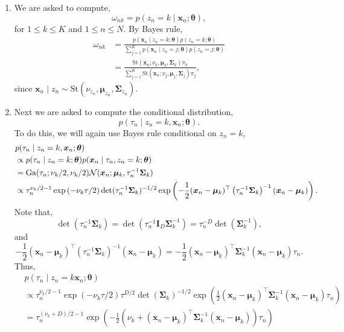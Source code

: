 \begin{enumerate}[label = (\alph*)]
    \item We are asked to compute,
    \[\omega_{nk} = p(z_n = k \mid \bm{x}_n;\bm{\theta}), \]
    for $1 \le k \le K$ and $1 \le n \le N$. By Bayes rule,
    \begin{align*}
        \omega_{nk} &= \frac{p(\bm{x}_n \mid z_n = k; \bm{\theta})p(z_n = k ;\bm{\theta})}{\sum_{j=1}^K p(\bm{x}_n \mid z_n = j; \bm{\theta})p(z_n = j ;\bm{\theta})}\\
        &= \frac{\mathrm{St}(\bm{x}_n ; \nu_k,\bm{\mu}_k, \bm{\Sigma}_k)\pi_k}{\sum_{j=1}^K \mathrm{St}(\bm{x}_n ; \nu_j,\bm{\mu}_j, \bm{\Sigma}_j)\pi_j},
    \end{align*}
    since $\bm{x}_n \mid z_n \sim \mathrm{St}\left(\nu_{z_n},\bm{\mu}_{z_n},\bm{\Sigma}_{z_n}\right)$.
    \item Next we are asked to compute the conditional distribution,
    \[p(\tau_n \mid z_n=k, \bm{x}_n; \bm{\theta}). \]
    To do this, we will again use Bayes rule conditional on $z_n=k$,
    \begin{align*}
        &p(\tau_n \mid z_n=k, \bm{x}_n; \bm{\theta})\\
        &\propto p(\tau_n \mid z_n=k;\bm{\theta})p(\bm{x}_n \mid \tau_n,z_n=k;\bm{\theta})\\
        &= \mathrm{Ga}(\tau_n;\nu_k/2, \nu_k/2){\mathcal N}(\bm{x}_n; \bm{\mu}_k, \tau_n^{-1}\bm{\Sigma}_k)\\
        &\propto \tau_n^{\nu_k/2 - 1}\exp\left(-\nu_k\tau/2\right)\det(\tau_n^{-1}\bm{\Sigma}_k)^{-1/2}\exp\left(-\frac{1}{2}(\bm{x}_n-\bm{\mu}_k)^\top\left(\tau_n^{-1}\bm{\Sigma}_k\right)^{-1}(\bm{x}_n - \bm{\mu}_k)\right).
    \end{align*}
    Note that,
    \[\det(\tau_n^{-1}\bm{\Sigma}_k) = \det(\tau_n^{-1}\bm{I}_D\bm{\Sigma}_k^{-1}) = \tau_n^{-D}\det(\bm{\Sigma}_k^{-1}), \]
    and
    \[-\frac{1}{2}(\bm{x}_n-\bm{\mu}_k)^\top\left(\tau_n^{-1}\bm{\Sigma}_k\right)^{-1}(\bm{x}_n - \bm{\mu}_k) =  - \frac{1}{2}(\bm{x}_n-\bm{\mu}_k)^\top\bm{\Sigma}_k^{-1}(\bm{x}_n - \bm{\mu}_k)\tau_n.\]
    Thus,
    \begin{align*}
        &p(\tau_n\mid z_n=k \bm{x}_n;\bm{\theta})\\
        &\propto \tau_n^{\nu_k/2 - 1}\exp\left(-\nu_k\tau/2\right)\tau^{D/2}\det(\bm{\Sigma}_k)^{-1/2}\exp\left(\frac{1}{2}(\bm{x}_n-\bm{\mu}_k)^\top\bm{\Sigma}_k^{-1}(\bm{x}_n - \bm{\mu}_k)\tau_n\right)\\
        &=\tau_n^{(\nu_k+D)/2 - 1}\exp\left(-\frac{1}{2}\left(\nu_k + (\bm{x}_n-\bm{\mu}_k)^\top\bm{\Sigma}_k^{-1}(\bm{x}_n - \bm{\mu}_k)\right)\tau_n\right)\\

\end{align*}
\end{enumerate}
